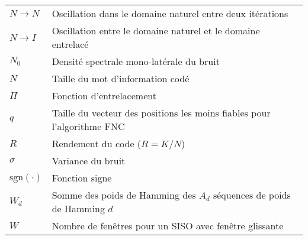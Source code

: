 \begin{center}
\begin{longtable}{ p{}  p{} }
$N	\rightarrow N$ 		&	Oscillation dans le domaine naturel entre deux itérations								\\
$N	\rightarrow I$ 		&	Oscillation entre le domaine naturel et le domaine entrelacé							\\
$N_0$    	 			&	Densité spectrale mono-latérale du bruit    											\\
$N$     	 			& 	Taille du mot d'information codé      													\\
$\Pi$					& 	Fonction d'entrelacement																\\
$q$      	        	&   Taille du vecteur des positions les moins fiables pour l'algorithme FNC 				\\  																			
$R$     	 			&	Rendement du code ($R=K/N$)       														\\
$\sigma$				&   Variance du bruit																		\\
$\text{sgn}(\cdot)$    	&	Fonction signe																			\\
$W_d$       	 		&	Somme des poids de Hamming des $A_d$ séquences de poids de Hamming $d$ 					\\
$W$       	       		&	Nombre de fenêtres pour un SISO avec fenêtre glissante        							\\


		
\end{longtable}

\end{center}
